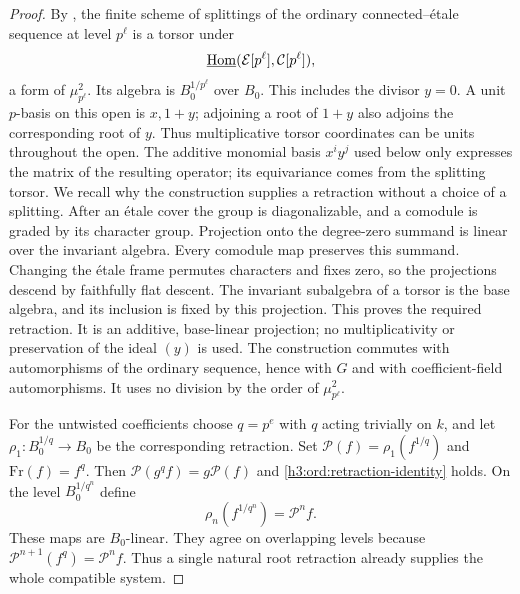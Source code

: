 \begin{proof}
By , the finite scheme of splittings of the
ordinary connected--\'{e}tale sequence at level $p^\ell$ is a torsor
under
\[
 \underline{\operatorname{Hom}}(\mathcal E[p^\ell],\mathcal C[p^\ell]),
\]
a form of $\mu_{p^\ell}^2$.  Its algebra is
$B_0^{1/p^\ell}$ over $B_0$.
This includes the divisor $y=0$.  A unit $p$-basis on this open is
$x,1+y$; adjoining a root of $1+y$ also adjoins the corresponding
root of $y$.  Thus multiplicative torsor coordinates can be units
throughout the open.  The additive monomial basis $x^iy^j$ used below
only expresses the matrix of the resulting operator; its equivariance
comes from the splitting torsor.
We recall why the construction supplies a retraction without a choice
of a splitting.  After an \'{e}tale cover the group is diagonalizable,
and a comodule is graded by its character group.  Projection onto the
degree-zero summand is linear over the invariant algebra.  Every
comodule map preserves this summand.  Changing the \'{e}tale frame
permutes characters and fixes zero, so the projections descend by
faithfully flat descent.  The invariant subalgebra of a torsor is the
base algebra, and its inclusion is fixed by this projection.
This proves the required retraction.  It is an additive, base-linear
projection; no multiplicativity or preservation of the ideal $(y)$ is
used.  The construction commutes with automorphisms of the ordinary sequence,
hence with $G$ and with coefficient-field automorphisms.  It uses no division by the order of
$\mu_{p^\ell}^2$.

For the untwisted coefficients choose $q=p^e$ with $q$ acting
trivially on $k$, and let $\rho_1:B_0^{1/q}\to B_0$ be the
corresponding retraction.  Set
$\mathcal P(f)=\rho_1(f^{1/q})$ and $\mathrm{Fr}(f)=f^q$.
Then $\mathcal P(g^qf)=g\mathcal P(f)$ and
\eqref{h3:ord:retraction-identity} holds.  On the level
$B_0^{1/q^n}$ define
\begin{equation}\label{h3:ord:finite-root-projection}
 \rho_n(f^{1/q^n})=\mathcal P^n f.
\end{equation}
These maps are $B_0$-linear.  They agree on overlapping levels because
$\mathcal P^{n+1}(f^q)=\mathcal P^nf$.
Thus a single natural root retraction already supplies the whole
compatible system.


\end{proof}
